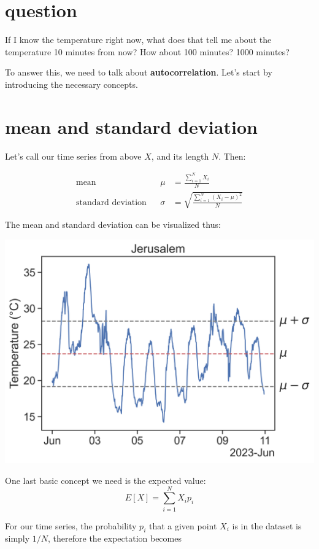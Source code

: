 \documentclass[
  letterpaper,
  DIV=11,
  numbers=noendperiod,
  oneside]{scrreprt}
\begin{document}
\hypertarget{question}{%
\section{question}\label{question}}

If I know the temperature right now, what does that tell me about the
temperature 10 minutes from now? How about 100 minutes? 1000 minutes?

To answer this, we need to talk about \textbf{autocorrelation}. Let's
start by introducing the necessary concepts.

\hypertarget{mean-and-standard-deviation}{%
\section{mean and standard
deviation}\label{mean-and-standard-deviation}}

Let's call our time series from above \(X\), and its length \(N\). Then:

\[
\begin{aligned}
\text{mean}& &\mu &= \frac{\displaystyle\sum_{i=1}^N X_i}{N} \\
\text{standard deviation}& &\sigma &= \sqrt{\frac{\displaystyle\sum_{i=1}^N (X_i-\mu)^2}{N}}
\end{aligned}
\]

The mean and standard deviation can be visualized thus:

\includegraphics{stationarity/jer_temp2.png}

One last basic concept we need is the expected value: \[
E[X] = \sum_{i=1}^N X_i p_i
\]

For our time series, the probability \(p_i\) that a given point \(X_i\)
is in the dataset is simply \(1/N\), therefore the expectation becomes
\end{document}
